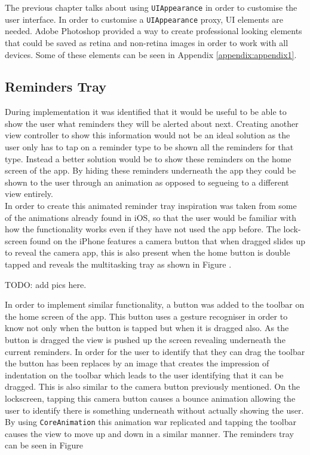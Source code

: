 \documentclass[12pt]{report}
\begin{document}
The previous chapter talks about using \texttt{UIAppearance} in order to customise the user interface. In order to customise a \texttt{UIAppearance} proxy, UI elements are needed. Adobe Photoshop provided a way to create professional looking elements that could be saved as retina and non-retina images in order to work with all devices. Some of these elements can be seen in Appendix \ref{appendix:appendix1}.

\subsection{Reminders Tray}

During implementation it was identified that it would be useful to be able to show the user what reminders they will be alerted about next. Creating another view controller to show this information would not be an ideal solution as the user only has to tap on a reminder type to be shown all the reminders for that type. Instead a better solution would be to show these reminders on the home screen of the app. By hiding these reminders underneath the app they could be shown to the user through an animation as opposed to segueing to a different view entirely.\\

In order to create this animated reminder tray inspiration was taken from some of the animations already found in iOS, so that the user would be familiar with how the functionality works even if they have not used the app before. The lock-screen found on the iPhone features a camera button that when dragged slides up to reveal the camera app, this is also present when the home button is double tapped and reveals the multitasking tray as shown in Figure .

TODO: add pics here.

In order to implement similar functionality, a button was added to the toolbar on the home screen of the app. This button uses a gesture recogniser in order to know not only when the button is tapped but when it is dragged also. As the button is dragged the view is pushed up the screen revealing underneath the current reminders. In order for the user to identify that they can drag the toolbar the button has been replaces by an image that creates the impression of indentation on the toolbar which leads to the user identifying that it can be dragged. This is also similar to the camera button previously mentioned. On the lockscreen, tapping this camera button causes a bounce animation allowing the user to identify there is something underneath without actually showing the user. By using \texttt{CoreAnimation} this animation war replicated and tapping the toolbar causes the view to move up and down in a similar manner. The reminders tray can be seen in Figure
\end{document}
